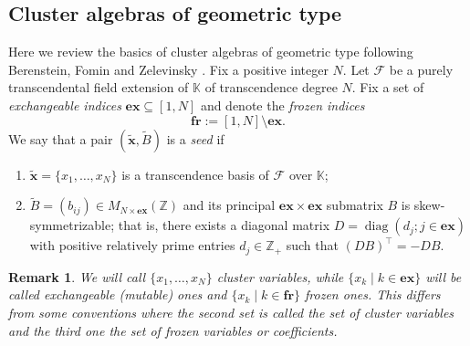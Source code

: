 \documentclass[11pt]{amsart}
\theoremstyle{plain}
\newtheorem{remark}[theorem]{Remark}
\newcommand \bre[1] { \begin{remark}\label{r#1}\rm }
\newcommand {\ere} { \end{remark} }
\def \KK {{\mathbb C}}
\def \KK {{\mathbb K}}
\def \Zset {{\mathbb Z}}
\def \B  {{\widetilde{B}}}
\newcommand \ex {{\mathbf{ex}}}
\newcommand \fr {{\mathbf{fr}}}
\def \x {{\wt{\mathbf{x}}}} %
\def \FF {{\mathcal{F}}}
\def \wt {\widetilde}
\DeclareMathOperator \diag { {\mathrm{diag}} }
\begin{document}
\subsection{Cluster algebras of geometric type}
\label{2.1}
Here we review the basics of cluster algebras of geometric type following Berenstein, Fomin and Zelevinsky \cite{BFZ05,FZ1}.
Fix a positive integer $N$. Let $\FF$ be a purely transcendental field extension of $\KK$ 
of transcendence degree $N$. Fix a set of {\em{exchangeable indices}}  $\ex\subseteq [1,N]$
and denote the {\em{frozen indices}}
\[
\fr := [1,N] \setminus \ex.
\]
We say that a pair $(\x, \B)$ is a {\em{seed}} if 
\begin{enumerate}
\item[(i)] $\x = \{x_1, \dots, x_N\}$ is a transcendence basis of $\FF$ over $\KK$;
\item[(ii)] $\B = (b_{ij})
\in M_{N\times \ex}(\Zset)$ and its principal $\ex\times \ex$ submatrix $B$
is skew-symmetrizable; that is, there exists a diagonal matrix $D=\diag(d_j; j \in \ex)$ with positive relatively prime entries $d_j \in \Zset_+$ such that $(D B)^\top = -D B$.
\end{enumerate}
\bre{cv} We will call $\{x_1, \ldots, x_N\}$ {\em{cluster variables}}, while $\{x_k \mid k \in \ex\}$ will be called {\em{exchangeable}} ({\em{mutable}}) ones and $\{x_k \mid k \in \fr\}$ frozen ones. This differs from some conventions where the second set is called the set of cluster variables and the third one the set of frozen variables or coefficients. 
\ere

\end{document}
